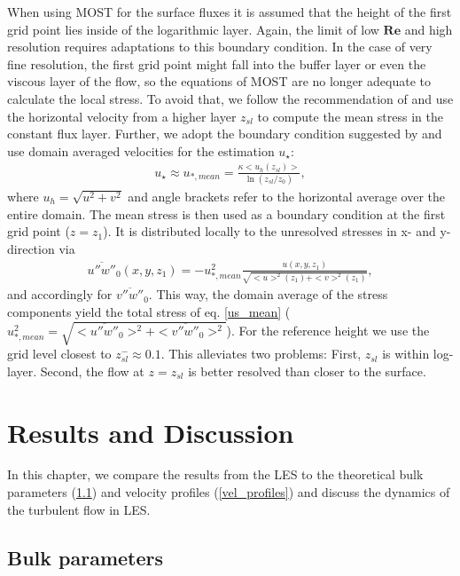 \documentclass[draft,a4paper,11pt]{article}
\newcommand{\RE}{\mathbf{Re}}
\begin{document}
When using MOST for the surface fluxes it is assumed that the height of the first grid point lies inside of the logarithmic layer. Again, the limit of low $\RE$ and high resolution requires adaptations to this boundary condition. In the case of very fine resolution, the first grid point might fall into the buffer layer or even the viscous layer of the flow, so the equations of MOST are no longer adequate to calculate the local stress. To avoid that, we follow the recommendation of \cite{kawai2012wall} and use the horizontal velocity from a higher layer $z_{sl}$ to compute the mean stress in the constant flux layer. Further, we adopt the boundary condition suggested by \cite{maronga2020improved} and use domain averaged velocities for the estimation $u_\star$:
\begin{align}\label{us_mean}
  u_\star \approx u_{*,mean} = \frac{\kappa<u_h(z_{sl})>}{\ln(z_{sl}/z_0)},
\end{align}
where $u_h= \sqrt{u^2+v^2}$ and angle brackets refer to the horizontal average over the entire domain. The mean stress is then used as a boundary condition at the first grid point ($z=z_1$). It is distributed locally to the unresolved stresses in x- and y-direction via
\begin{align}
  \overline{u''w''}_0(x,y,z_1) = -u_{*,mean}^2 \frac{u(x,y,z_1)}{\sqrt{<u>^2(z_1)+<v>^2(z_1)}},
\end{align}
and accordingly for $\overline{v''w''}_0$. This way, the domain average of the stress components yield the total stress of eq. \ref{us_mean} ($u_{*,mean}^2 = \sqrt{<\overline{u''w''}_0>^2+<\overline{v''w''}_0>^2}$). For the reference height we use the grid level closest to $z_{sl}^- \approx 0.1$. This alleviates two problems: First, $z_{sl}$ is within log-layer. Second, the flow at $z=z_{sl}$ is better resolved than closer to the surface.

\section{Results and Discussion}
\label{results}

In this chapter, we compare the results from the LES to the theoretical bulk parameters (\ref{bulk}) and velocity profiles (\ref{vel_profiles}) and discuss the dynamics of the turbulent flow in LES.

\subsection{Bulk parameters}
\label{bulk}
\end{document}
